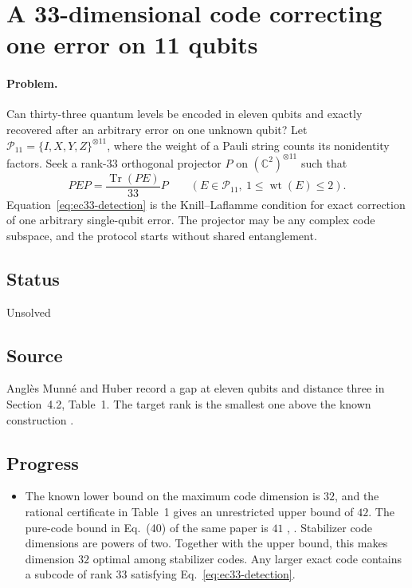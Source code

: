 \section{A 33-dimensional code correcting one error on 11 qubits}
\label{sec:op_0ace432292929e70}

\paragraph{Problem.}
Can thirty-three quantum levels be encoded in eleven qubits and exactly recovered after an arbitrary error on one unknown qubit? Let $\mathcal P_{11}=\{I,X,Y,Z\}^{\otimes 11}$, where the weight of a Pauli string counts its nonidentity factors. Seek a rank-$33$ orthogonal projector $P$ on $(\mathbb C^2)^{\otimes 11}$ such that
\begin{equation}
PEP=\frac{\operatorname{Tr}(PE)}{33}P
\qquad(E\in\mathcal P_{11},\ 1\leq\operatorname{wt}(E)\leq 2).
\label{eq:ec33-detection}
\end{equation}
Equation~\eqref{eq:ec33-detection} is the Knill--Laflamme condition for exact correction of one arbitrary single-qubit error. The projector may be any complex code subspace, and the protocol starts without shared entanglement.

\subsection*{Status}

Unsolved

\subsection*{Source}

Anglès Munné and Huber record a gap at eleven qubits and distance three in Section~4.2, Table~1. The target rank is the smallest one above the known construction .

\subsection*{Progress}

\begin{itemize}
  \item The known lower bound on the maximum code dimension is $32$, and the rational certificate in Table~1 gives an unrestricted upper bound of $42$. The pure-code bound in Eq.~(40) of the same paper is $41$ , . Stabilizer code dimensions are powers of two. Together with the upper bound, this makes dimension $32$ optimal among stabilizer codes. Any larger exact code contains a subcode of rank $33$ satisfying Eq.~\eqref{eq:ec33-detection}.
\end{itemize}

